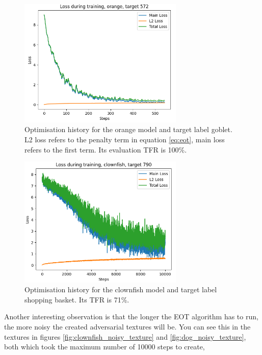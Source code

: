 \begin{figure}[ht]
    \centering
    \includegraphics[width=0.7\textwidth]{graphics/eot_orange_loss_history.PNG}
    \caption{Optimisation history for the orange model and target label goblet. L2 loss refers to the penalty term in equation \ref{eq:eot}, main loss refers to the first term. Its evaluation TFR is 100\%.}
    \label{fig:eot_orange_loss_history}
\end{figure}

\begin{figure}[ht]
    \centering
    \includegraphics[width=0.7\textwidth]{graphics/eot_clownfish_loss_history.PNG}
    \caption{Optimisation history for the clownfish model and target label shopping basket. Its TFR is 71\%.}
    \label{fig:eot_clownfish_loss_history}
\end{figure}

Another interesting observation is that the longer the EOT algorithm has to run, the more noisy the created adversarial textures will be. You can see this in the textures in figures  \ref{fig:clownfish_noisy_texture} and \ref{fig:dog_noisy_texture}, both which took the maximum number of 10000 steps to create,

